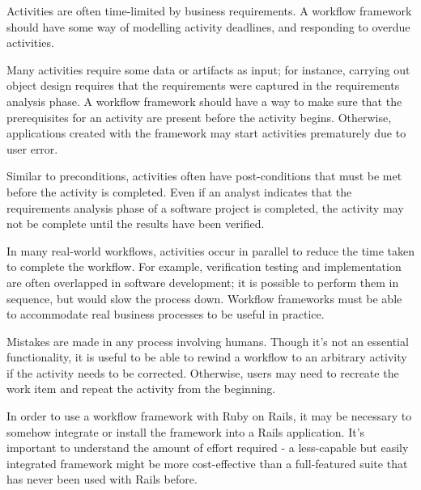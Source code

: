 \documentclass[document.tex]{subfiles}
\begin{document}

Activities are often time-limited by business requirements. A workflow framework should have some way of modelling activity deadlines, and responding to overdue activities.


Many activities require some data or artifacts as input; for instance, carrying out object design requires that the requirements were captured in the requirements analysis phase. A workflow framework should have a way to make sure that the prerequisites for an activity are present before the activity begins. Otherwise, applications created with the framework may start activities prematurely due to user error.


Similar to preconditions, activities often have post-conditions that must be met before the activity is completed. Even if an analyst indicates that the requirements analysis phase of a software project is completed, the activity may not be complete until the results have been verified.


In many real-world workflows, activities occur in parallel to reduce the time taken to complete the workflow. For example, verification testing and implementation are often overlapped in software development; it is possible to perform them in sequence, but would slow the process down. Workflow frameworks must be able to accommodate real business processes to be useful in practice.


Mistakes are made in any process involving humans. Though it's not an essential functionality, it is useful to be able to rewind a workflow to an arbitrary activity if the activity needs to be corrected. Otherwise, users may need to recreate the work item and repeat the activity from the beginning.


In order to use a workflow framework with Ruby on Rails, it may be necessary to somehow integrate or install the framework into a Rails application. It's important to understand the amount of effort required - a less-capable but easily integrated framework might be more cost-effective than a full-featured suite that has never been used with Rails before.
\end{document}
